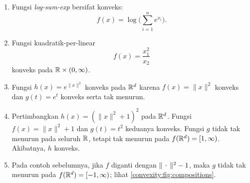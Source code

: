\begin{example}
    \begin{enumerate}
        \item Fungsi \emph{log-sum-exp} bersifat konveks:
        \begin{equation}
            f(x)=\log\bigg(\sum_{i=1}^n e^{x_i}\bigg).
        \end{equation}
        \item Fungsi kuadratik-per-linear
        \begin{equation}
            f(x)=\frac{x_1^2}{x_2}
        \end{equation}
        konveks pada $\mathbb{R}\times(0,\infty)$.
        \item Fungsi $h(x)=e^{\|x\|^2}$ konveks pada $\mathbb{R}^d$ karena $f(x)=\|x\|^2$ konveks dan $g(t)=e^t$ konveks serta tak menurun.
        \item Pertimbangkan $h(x)=(\|x\|^2+1)^2$ pada $\mathbb{R}^d$. Fungsi $f(x)=\|x\|^2+1$ dan $g(t)=t^2$ keduanya konveks. Fungsi $g$ tidak tak menurun pada seluruh $\mathbb{R}$, tetapi tak menurun pada $f(\mathbb{R}^d)=[1,\infty)$. Akibatnya, $h$ konveks.
        \item Pada contoh sebelumnya, jika $f$ diganti dengan $\|\,\cdot\,\|^2-1$, maka $g$ tidak tak menurun pada $f(\mathbb{R}^d)=[-1,\infty)$; lihat \cref{convexity:fig:compositions}.
    \end{enumerate}
\end{example}

